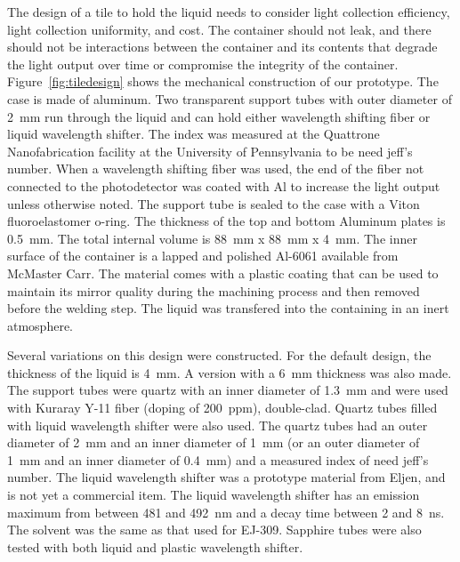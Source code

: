 \documentclass[review]{elsarticle}
\begin{document}
The design of a tile to hold the liquid needs to consider light
collection efficiency, light collection uniformity, and cost. The
container should not leak, and there should not be interactions
between the container and its contents that degrade the light output
over time or compromise the integrity of the
container. Figure~\ref{fig:tiledesign} shows the mechanical
construction of our prototype. The case is made of aluminum. Two
transparent support tubes with outer diameter of 2~mm run through the
liquid and can hold either wavelength shifting fiber or liquid
wavelength shifter. The index was measured at the Quattrone
Nanofabrication facility at the University of Pennsylvania to be
{\color{red} need jeff's number}. When a wavelength shifting fiber was
used, the end of the fiber not connected to the photodetector was
coated with Al to increase the light output unless otherwise
noted. The support tube is sealed to the case with a Viton
fluoroelastomer o-ring. The thickness of the top and bottom Aluminum
plates is 0.5~mm. The total internal volume is 88~mm x 88~mm x
4~mm. The inner surface of the container is a lapped and polished
Al-6061 available from McMaster Carr. The material comes with a
plastic coating that can be used to maintain its mirror quality during
the machining process and then removed before the welding step. The
liquid was transfered into the containing in an inert atmosphere.

Several variations on this design were constructed. For the default
design, the thickness of the liquid is 4~mm. A version with a 6~mm
thickness was also made. The support tubes were quartz with an inner
diameter of 1.3~mm and were used with Kuraray Y-11 fiber (doping of
200~ppm), double-clad. Quartz tubes filled with liquid wavelength
shifter were also used. The quartz tubes had an outer diameter of 2~mm
and an inner diameter of 1~mm (or an outer diameter of 1~mm and an
inner diameter of 0.4~mm) and a measured index of {\color{red} need
  jeff's number}. The liquid wavelength shifter was a prototype
material from Eljen, and is not yet a commercial item. The liquid
wavelength shifter has an emission maximum from between 481 and 492~nm
and a decay time between 2 and 8~ns. The solvent was the same as that
used for EJ-309. Sapphire tubes were also tested with both liquid and
plastic wavelength shifter.
\end{document}
